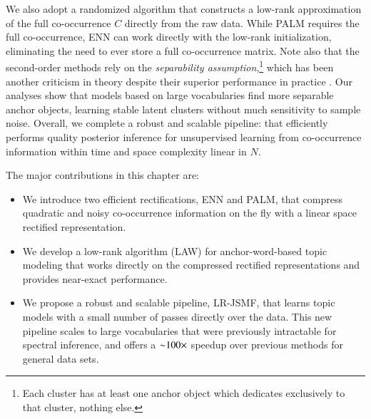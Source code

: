We also adopt a randomized algorithm that constructs a low\hyp{}rank
approximation of the full co\hyp{}occurrence $C$ directly from the raw data.
While PALM requires the full co\hyp{}occurrence, ENN can work directly with the
low\hyp{}rank initialization, eliminating the need to ever store a full 
co\hyp{}occurrence matrix. Note also that the second\hyp{}order methods rely on
the \textit{separability assumption},\footnote{Each cluster has at least one
anchor object which dedicates exclusively to that cluster, nothing else.} which
has been another criticism in theory despite their superior performance in
practice \cite{moontae2017from}. Our analyses show that models based on large
vocabularies find more separable anchor objects, learning stable latent clusters
without much sensitivity to sample noise. Overall, we complete a robust and
scalable pipeline: that efficiently performs quality posterior inference for
unsupervised learning from co\hyp{}occurrence information within time and space
complexity linear in $N$. 

The major contributions in this chapter are:
\begin{itemize}[leftmargin=*]
    \item We introduce two efficient rectifications, ENN and PALM, that compress
    quadratic and noisy co\hyp{}occurrence information on the fly with a linear
    space rectified representation. 
    \item We develop a low\hyp{}rank algorithm (LAW) for 
    anchor\hyp{}word\hyp{}based topic modeling that works directly on the
    compressed rectified representations and provides near\hyp{}exact
    performance.
    \item We propose a robust and scalable pipeline, LR\hyp{}JSMF, that learns
    topic models with a small number of passes directly over the data.  This new
    pipeline scales to large vocabularies that were previously intractable for
    spectral inference, and offers a $\mathbf{\sim}100\mathbin{\times}$ speedup over
    previous methods for general data sets.
\end{itemize} 